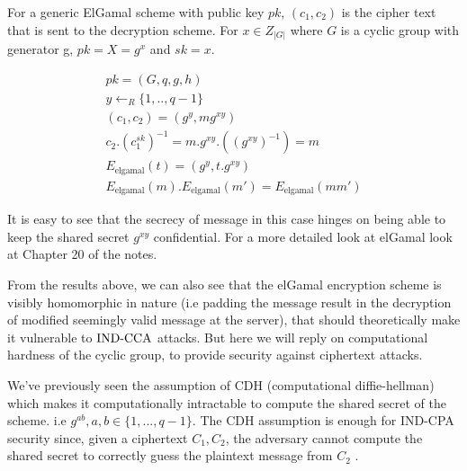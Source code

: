 For a generic ElGamal scheme with public key $pk$, $(c_1,c_2)$ is the cipher text that is sent to the decryption scheme. For $x \in Z_{|G|}$ where $G$ is a cyclic group with generator g, $pk = X = g^x$ and $sk = x$. 

\begin{center}
\begin{align*}
	pk = (G, q, g, h) \\
	y \leftarrow_{R} \{1, .., q-1\} \\
	(c_1, c_2) = (g^{y}, mg^{xy}) \\
	c_2.(c_{1}^{sk})^{-1} = m.g^{xy}.((g^{xy})^{-1}) = m \\
	E_{\text{elgamal}}(t) = (g^{y}, t.g^{xy}) \\
	E_{\text{elgamal}}(m).E_{\text{elgamal}}(m') = E_{\text{elgamal}}(mm')
\end{align*} 
\end{center}
\indent It is easy to see that the secrecy of message in this case hinges on being able to keep the shared secret $g^{xy}$ confidential. For a more detailed look at elGamal look at Chapter 20 of the notes. \newline

\indent From the results above, we can also see that the elGamal encryption scheme is visibly homomorphic in nature (i.e padding the message result in the decryption of modified seemingly valid message at the server), that should theoretically make it vulnerable to $\textnormal{IND-CCA}$ attacks. But here we will reply on computational hardness of the cyclic group, to provide security against ciphertext attacks.

\begin{center}
\end{center}

We've previously seen the assumption of CDH (computational diffie-hellman) which makes it computationally intractable to compute the shared secret of the scheme. i.e $g^{ab}, a,b \in \{1, ..., q-1\}$. The CDH assumption is enough for IND-CPA security since, given a ciphertext $C_1,C_2$, the adversary cannot compute the shared secret to correctly guess the plaintext message from $C_2$ .\newline

